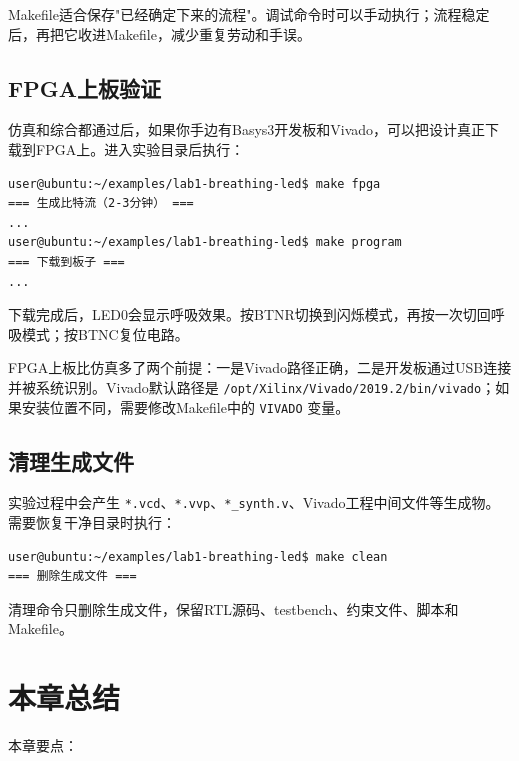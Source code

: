 \documentclass[11pt,a4paper]{article}
\begin{document}
\begin{tipbox}
Makefile适合保存"已经确定下来的流程"。调试命令时可以手动执行；流程稳定后，再把它收进Makefile，减少重复劳动和手误。
\end{tipbox}

\subsection{FPGA上板验证}

仿真和综合都通过后，如果你手边有Basys3开发板和Vivado，可以把设计真正下载到FPGA上。进入实验目录后执行：

\begin{lstlisting}[style=shell]
user@ubuntu:~/examples/lab1-breathing-led$ make fpga
=== 生成比特流（2-3分钟） ===
...
user@ubuntu:~/examples/lab1-breathing-led$ make program
=== 下载到板子 ===
...
\end{lstlisting}

下载完成后，LED0会显示呼吸效果。按BTNR切换到闪烁模式，再按一次切回呼吸模式；按BTNC复位电路。

\begin{warnbox}
FPGA上板比仿真多了两个前提：一是Vivado路径正确，二是开发板通过USB连接并被系统识别。Vivado默认路径是 \texttt{/opt/Xilinx/Vivado/2019.2/bin/vivado}；如果安装位置不同，需要修改Makefile中的 \texttt{VIVADO} 变量。
\end{warnbox}

\subsection{清理生成文件}

实验过程中会产生 \texttt{*.vcd}、\texttt{*.vvp}、\texttt{*\_synth.v}、Vivado工程中间文件等生成物。需要恢复干净目录时执行：

\begin{lstlisting}[style=shell]
user@ubuntu:~/examples/lab1-breathing-led$ make clean
=== 删除生成文件 ===
\end{lstlisting}

清理命令只删除生成文件，保留RTL源码、testbench、约束文件、脚本和Makefile。

\section{本章总结}

本章要点：
\end{document}
